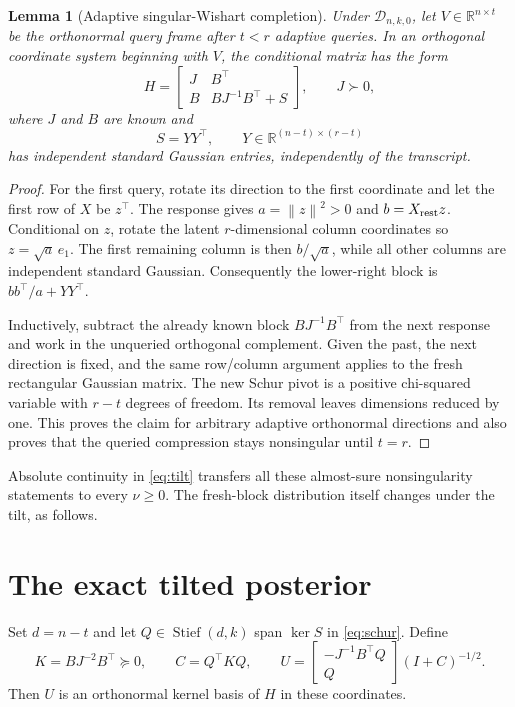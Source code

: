 \documentclass[11pt]{article}
\numberwithin{equation}{section}
\newtheorem{lemma}[theorem]{Lemma}
\theoremstyle{remark}\newtheorem{remark}[theorem]{Remark}
\newcommand{\R}{\mathbb R}
\newcommand{\norm}[1]{\left\lVert #1\right\rVert}
\newcommand{\St}{\operatorname{Stief}}
\newcommand{\calD}{\mathcal D}
\begin{document}
\begin{lemma}[Adaptive singular-Wishart completion]\label{lem:schur}
Under $\calD_{n,k,0}$, let $V\in\R^{n\times t}$ be the orthonormal query frame after $t<r$ adaptive queries. In an orthogonal coordinate system beginning with $V$, the conditional matrix has the form
\begin{equation}\label{eq:schur}
H=\begin{bmatrix}J&B^\top\\ B&BJ^{-1}B^\top+S\end{bmatrix},
\qquad J\succ0,
\end{equation}
where $J$ and $B$ are known and
\[
S=YY^\top,\qquad Y\in\R^{(n-t)\times(r-t)}
\]
has independent standard Gaussian entries, independently of the transcript.
\end{lemma}
\begin{proof}
For the first query, rotate its direction to the first coordinate and let the first row of $X$ be $z^\top$. The response gives $a=\norm z^2>0$ and $b=X_{\rm rest}z$. Conditional on $z$, rotate the latent $r$-dimensional column coordinates so $z=\sqrt a\,e_1$. The first remaining column is then $b/\sqrt a$, while all other columns are independent standard Gaussian. Consequently the lower-right block is $bb^\top/a+YY^\top$.

Inductively, subtract the already known block $BJ^{-1}B^\top$ from the next response and work in the unqueried orthogonal complement. Given the past, the next direction is fixed, and the same row/column argument applies to the fresh rectangular Gaussian matrix. The new Schur pivot is a positive chi-squared variable with $r-t$ degrees of freedom. Its removal leaves dimensions reduced by one. This proves the claim for arbitrary adaptive orthonormal directions and also proves that the queried compression stays nonsingular until $t=r$.
\end{proof}
Absolute continuity in \eqref{eq:tilt} transfers all these almost-sure nonsingularity statements to every $\nu\ge0$. The fresh-block distribution itself changes under the tilt, as follows.

\section{The exact tilted posterior}\label{sec:posterior}
Set $d=n-t$ and let $Q\in\St(d,k)$ span $\ker S$ in \eqref{eq:schur}. Define
\begin{equation}\label{eq:graphdefs}
K=BJ^{-2}B^\top\succeq0,\qquad C=Q^\top KQ,\qquad
U=\begin{bmatrix}-J^{-1}B^\top Q\\ Q\end{bmatrix}(I+C)^{-1/2}.
\end{equation}
Then $U$ is an orthonormal kernel basis of $H$ in these coordinates.
\end{document}
